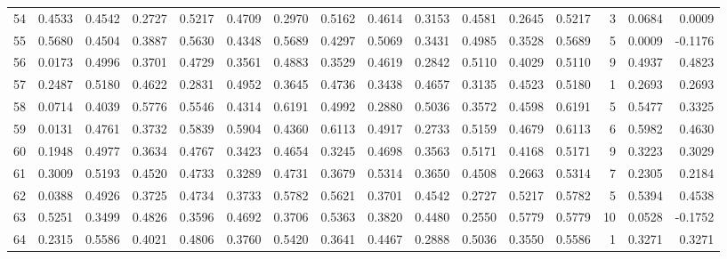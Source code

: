 \begin{tabular}{lrrrrrrrrrrrrrrr}
54  &      0.4533 &  0.4542 &  0.2727 &  0.5217 &  0.4709 &  0.2970 &  0.5162 &  0.4614 &  0.3153 &  0.4581 &   0.2645 &     0.5217 &      3 &                    0.0684 &                     0.0009 \\
55  &      0.5680 &  0.4504 &  0.3887 &  0.5630 &  0.4348 &  0.5689 &  0.4297 &  0.5069 &  0.3431 &  0.4985 &   0.3528 &     0.5689 &      5 &                    0.0009 &                    -0.1176 \\
56  &      0.0173 &  0.4996 &  0.3701 &  0.4729 &  0.3561 &  0.4883 &  0.3529 &  0.4619 &  0.2842 &  0.5110 &   0.4029 &     0.5110 &      9 &                    0.4937 &                     0.4823 \\
57  &      0.2487 &  0.5180 &  0.4622 &  0.2831 &  0.4952 &  0.3645 &  0.4736 &  0.3438 &  0.4657 &  0.3135 &   0.4523 &     0.5180 &      1 &                    0.2693 &                     0.2693 \\
58  &      0.0714 &  0.4039 &  0.5776 &  0.5546 &  0.4314 &  0.6191 &  0.4992 &  0.2880 &  0.5036 &  0.3572 &   0.4598 &     0.6191 &      5 &                    0.5477 &                     0.3325 \\
59  &      0.0131 &  0.4761 &  0.3732 &  0.5839 &  0.5904 &  0.4360 &  0.6113 &  0.4917 &  0.2733 &  0.5159 &   0.4679 &     0.6113 &      6 &                    0.5982 &                     0.4630 \\
60  &      0.1948 &  0.4977 &  0.3634 &  0.4767 &  0.3423 &  0.4654 &  0.3245 &  0.4698 &  0.3563 &  0.5171 &   0.4168 &     0.5171 &      9 &                    0.3223 &                     0.3029 \\
61  &      0.3009 &  0.5193 &  0.4520 &  0.4733 &  0.3289 &  0.4731 &  0.3679 &  0.5314 &  0.3650 &  0.4508 &   0.2663 &     0.5314 &      7 &                    0.2305 &                     0.2184 \\
62  &      0.0388 &  0.4926 &  0.3725 &  0.4734 &  0.3733 &  0.5782 &  0.5621 &  0.3701 &  0.4542 &  0.2727 &   0.5217 &     0.5782 &      5 &                    0.5394 &                     0.4538 \\
63  &      0.5251 &  0.3499 &  0.4826 &  0.3596 &  0.4692 &  0.3706 &  0.5363 &  0.3820 &  0.4480 &  0.2550 &   0.5779 &     0.5779 &     10 &                    0.0528 &                    -0.1752 \\
64  &      0.2315 &  0.5586 &  0.4021 &  0.4806 &  0.3760 &  0.5420 &  0.3641 &  0.4467 &  0.2888 &  0.5036 &   0.3550 &     0.5586 &      1 &                    0.3271 &                     0.3271 \\

\end{tabular}
